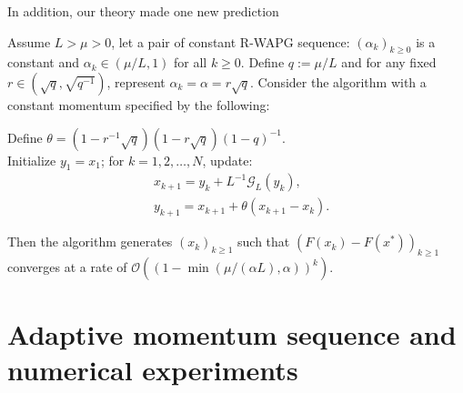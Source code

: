 \documentclass[11pt]{beamer}
\theoremstyle{definition}
\begin{document}
        \begin{frame}{In addition, our theory made one new prediction}
            \begin{theorem}\label{thm:fixed-momentum-fista}
                {\small
                Assume $L > \mu > 0$, let a pair of constant R-WAPG sequence: $(\alpha_k)_{k \ge0}$ is a constant and $\alpha_k \in (\mu/L, 1)$ for all $k \ge 0$.
                Define $q := \mu/L$ and for any fixed $r \in \left(\sqrt{q}, \sqrt{q^{-1}}\right)$, represent $\alpha_k = \alpha = r \sqrt{q}$. 
                Consider the algorithm with a constant momentum specified by the following:
                \begin{tcolorbox}
                    Define $\theta = \left(1 - r^{-1}\sqrt{q}\right)(1 - r\sqrt{q})(1 - q)^{-1}$.
                    \\
                    Initialize $y_1 = x_1$; for $k = 1, 2, \ldots, N$, update:
                    \begin{align*}
                        &x_{k + 1} = y_k + L^{-1}\mathcal G_L (y_k)
                        ,
                        \\
                        & y_{k + 1} = x_{k + 1} + \theta(x_{k + 1} - x_k).
                    \end{align*}
                \end{tcolorbox}
                Then the algorithm generates $(x_k)_{k \ge 1}$ such that $(F(x_{k}) - F(x^*))_{k\geq 1}$ converges at a rate of $\mathcal O\left(\left(1 - \min\left(\mu/(\alpha L), \alpha\right)\right)^k\right)$.
                }
            \end{theorem}
        \end{frame}
\section{Adaptive momentum sequence and numerical experiments}
\end{document}
